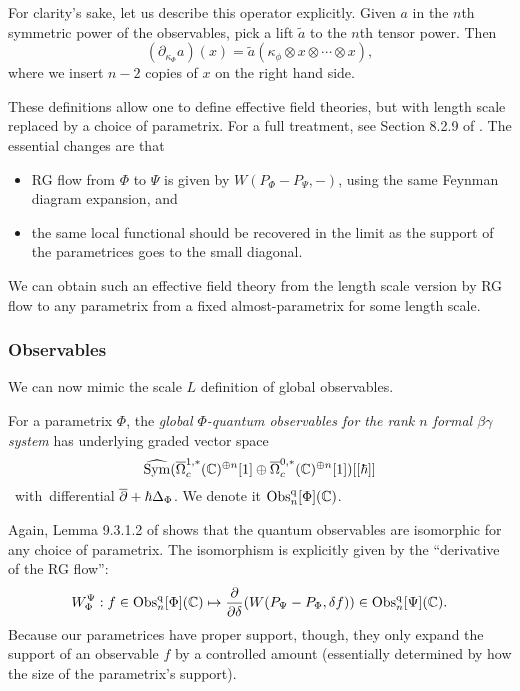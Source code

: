 For clarity's sake, let us describe this operator explicitly.
Given $a$ in the $n$th symmetric power of the observables, pick a lift $\tilde{a}$ to the $n$th tensor power.
Then 
\[
(\partial_{\kappa_\Phi}a)(x) = \tilde{a}(\kappa_\phi \otimes x \otimes \cdots \otimes x),
\]
where we insert $n-2$ copies of $x$ on the right hand side.

These definitions allow one to define effective field theories, but with length scale replaced by a choice of parametrix.
For a full treatment, see Section 8.2.9 of \cite{CG2}.
The essential changes are that 
\begin{itemize}
\item RG flow from $\Phi$ to $\Psi$ is given by $W(P_\Phi - P_\Psi,-)$, using the same Feynman diagram expansion, and
\item the same local functional should be recovered in the limit as the support of the parametrices goes to the small diagonal.
\end{itemize} 
We can obtain such an effective field theory from the length scale version 
by RG flow to any parametrix from a fixed almost-parametrix for some length scale.

\subsubsection{Observables}

We can now mimic the scale $L$ definition of global observables.

\begin{dfn}
For a parametrix $\Phi$, the  \emph{global $\Phi$-quantum observables for the rank $n$ formal $\beta\gamma$ system} 
has underlying graded vector space \si 
\[
\widehat{{\rm Sym}}(\overline{\Omega}_c^{1,*}(\mathbb C)^{\oplus n}[1] \oplus \overline{\Omega}^{0,*}_c(\mathbb C)^{\oplus n}[1])[[\hbar]]
\]
with differential $\overline{\partial} + \hbar \Delta_\Phi$. 
We denote it ${\rm Obs}^{\rm q}_n[\Phi](\mathbb C)$.
\end{dfn}

Again, Lemma 9.3.1.2 of \cite{CG2} shows that the quantum observables are isomorphic for any choice of parametrix.
The isomorphism is explicitly given by the ``derivative of the RG flow'':
\[
W_\Phi^\Psi: f \in {\rm Obs}^{\rm q}_n[\Phi](\mathbb C) \mapsto \frac{\partial}{\partial \delta}(W(P_\Psi - P_\Phi, \delta f)) \in {\rm Obs}^{\rm q}_n[\Psi](\mathbb C).
\]
Because our parametrices have proper support, though, they only expand the support of an observable $f$ by a controlled amount 
(essentially determined by how the size of the parametrix's support).

